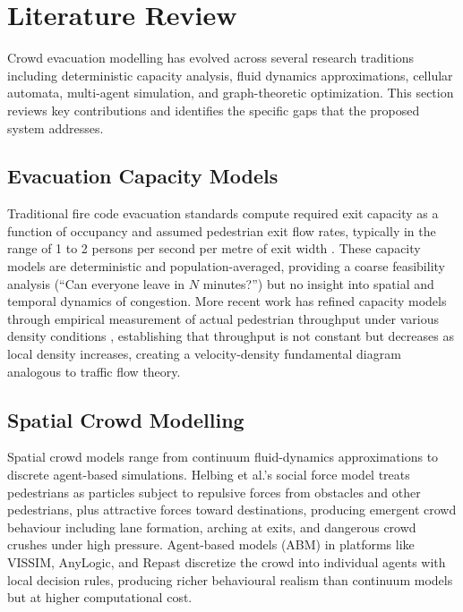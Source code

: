\documentclass[conference]{IEEEtran}
\begin{document}
\section{Literature Review}

Crowd evacuation modelling has evolved across several research traditions including deterministic capacity analysis, fluid dynamics approximations, cellular automata, multi-agent simulation, and graph-theoretic optimization. This section reviews key contributions and identifies the specific gaps that the proposed system addresses.

\subsection{Evacuation Capacity Models}

Traditional fire code evacuation standards compute required exit capacity as a function of occupancy and assumed pedestrian exit flow rates, typically in the range of 1 to 2 persons per second per metre of exit width \cite{pauls1984movement}. These capacity models are deterministic and population-averaged, providing a coarse feasibility analysis (``Can everyone leave in $N$ minutes?'') but no insight into spatial and temporal dynamics of congestion. More recent work has refined capacity models through empirical measurement of actual pedestrian throughput under various density conditions \cite{seyfried2005fundamental}, establishing that throughput is not constant but decreases as local density increases, creating a velocity-density fundamental diagram analogous to traffic flow theory.

\subsection{Spatial Crowd Modelling}

Spatial crowd models range from continuum fluid-dynamics approximations to discrete agent-based simulations. Helbing et al.'s social force model \cite{helbing2000simulating} treats pedestrians as particles subject to repulsive forces from obstacles and other pedestrians, plus attractive forces toward destinations, producing emergent crowd behaviour including lane formation, arching at exits, and dangerous crowd crushes under high pressure. Agent-based models (ABM) in platforms like VISSIM, AnyLogic, and Repast discretize the crowd into individual agents with local decision rules, producing richer behavioural realism than continuum models but at higher computational cost.
\end{document}
